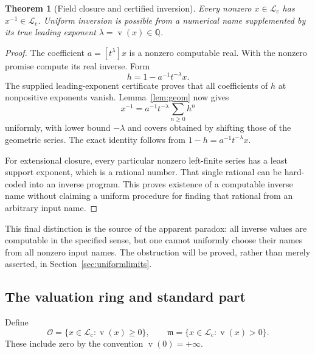 \documentclass[11pt,letterpaper]{article}
\numberwithin{equation}{section}
\newtheorem{theorem}{Theorem}[section]
\theoremstyle{definition}
\theoremstyle{remark}
\newcommand{\Lc}{\mathcal L_{\mathrm c}}
\newcommand{\Q}{\mathbb Q}
\newcommand{\val}{\operatorname{v}}
\newcommand{\coef}[2]{[t^{#1}]#2}
\newcommand{\Oh}{\mathcal O}
\newcommand{\mh}{\mathfrak m}
\begin{document}
\begin{theorem}[Field closure and certified inversion]
\label{thm:inverse}
Every nonzero $x\in\Lc$ has $x^{-1}\in\Lc$. Uniform inversion is possible
from a numerical name supplemented by its true leading exponent
$\lambda=\val(x)\in\Q$.
\end{theorem}
\begin{proof}
The coefficient $a=\coef\lambda x$ is a nonzero computable real. With the
nonzero promise compute its real inverse. Form
\[
 h=1-a^{-1}t^{-\lambda}x.
\]
The supplied leading-exponent certificate proves that all coefficients of
$h$ at nonpositive exponents vanish. Lemma~\ref{lem:geom} now gives
\begin{equation}\label{eq:inverse}
 x^{-1}=a^{-1}t^{-\lambda}\sum_{n\ge0}h^n
\end{equation}
uniformly, with lower bound $-\lambda$ and covers obtained by shifting
those of the geometric series. The exact identity follows from
$1-h=a^{-1}t^{-\lambda}x$.

For extensional closure, every particular nonzero left-finite series has a
least support exponent, which is a rational number. That single rational
can be hard-coded into an inverse program. This proves existence of a
computable inverse name without claiming a uniform procedure for finding
that rational from an arbitrary input name.
\end{proof}

This final distinction is the source of the apparent paradox: all inverse
values are computable in the specified sense, but one cannot uniformly
choose their names from all nonzero input names. The obstruction will be
proved, rather than merely asserted, in Section~\ref{sec:uniformlimits}.

\subsection{The valuation ring and standard part}

Define
\[
 \Oh=\{x\in\Lc:\val(x)\ge0\},\qquad
 \mh=\{x\in\Lc:\val(x)>0\}.
\]
These include zero by the convention $\val(0)=+\infty$.
\end{document}
